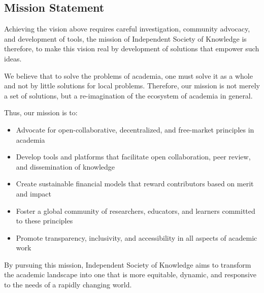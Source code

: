 \subsection{Mission Statement}\label{subsec:mission-statement}
Achieving the vision above requires careful investigation, community advocacy, and development of tools, the mission of Independent Society of Knowledge is therefore, to make this vision real by development of solutions that empower such ideas.

We believe that to solve the problems of academia, one must solve it as a whole and not by little solutions for local problems.
Therefore, our mission is not merely a set of solutions, but a re-imagination of the ecosystem of academia in general.

Thus, our mission is to:
\begin{itemize}
    \item Advocate for open-collaborative, decentralized, and free-market principles in academia
    \item Develop tools and platforms that facilitate open collaboration, peer review, and dissemination of knowledge
    \item Create sustainable financial models that reward contributors based on merit and impact
    \item Foster a global community of researchers, educators, and learners committed to these principles
    \item Promote transparency, inclusivity, and accessibility in all aspects of academic work
\end{itemize}
By pursuing this mission, Independent Society of Knowledge aims to transform the academic landscape into one that is more equitable, dynamic, and responsive to the needs of a rapidly changing world.